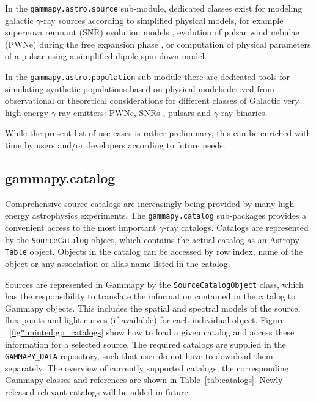 \documentclass[longauth]{aa}
\newcommand{\code}[1]{\texttt{#1}}
\newcommand{\gammapy}{Gammapy\xspace}
\newcommand{\gammaray}{$\gamma$-ray\xspace}
\begin{document}
In the \code{gammapy.astro.source} sub-module, dedicated classes exist for modeling
galactic \gammaray sources according to simplified physical models, for example supernova remnant (SNR) evolution
models \citep{1950RSPSA.201..159T, 1999ApJS..120..299T}, evolution of pulsar wind nebulae (PWNe) during the
free expansion phase \citep{2006ARA&A..44...17G}, or computation
of physical parameters of a pulsar using a simplified dipole spin-down model.

In the \code{gammapy.astro.population} sub-module there are dedicated tools
for simulating synthetic populations based on physical models derived from
observational or theoretical considerations for different classes of Galactic
very high-energy \gammaray emitters: PWNe, SNRs \cite{1998ApJ...504..761C},
pulsars \cite{2006ApJ...643..332F, 2006MNRAS.372..777L, 2004A&A...422..545Y}
and \gammaray binaries.

While the present list of use cases is rather preliminary, this can be enriched
with time by users and/or developers according to future needs.

\subsection{gammapy.catalog}
\label{ssec:gammapy-catalog}
Comprehensive source catalogs are increasingly being provided by many high-energy
astrophysics experiments. The \code{gammapy.catalog} sub-packages
provides a convenient access to the most important \gammaray catalogs.
Catalogs are represented by the \code{SourceCatalog} object, which
contains the actual catalog as an Astropy \code{Table} object.
Objects in the catalog can be accessed by row index, name of the
object or any association or alias name listed in the catalog.

Sources are represented in \gammapy by the \code{SourceCatalogObject}
class, which has the responsibility to translate the information
contained in the catalog to \gammapy objects. This includes
the spatial and spectral models of the source, flux points and
light curves (if available) for each individual object. 
Figure ~\ref{fig*:minted:gp_catalogs}
show how to load a given catalog and access these information for a selected source.
The required catalogs are supplied in the \code{GAMMAPY\_DATA} repository, such that 
user do not have to download them separately.
The overview of currently supported catalogs, the corresponding
\gammapy classes and references are shown in Table~\ref{tab:catalogs}.
Newly released relevant catalogs will be added in future.
\end{document}
